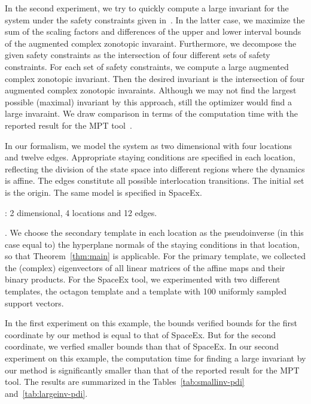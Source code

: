 In the second experiment, we try to quickly compute a large invariant
for the system under the safety constraints given
in~\cite{rakovic2004computation}.  %
In the latter case, we maximize the sum of the scaling factors and
differences of the upper and lower interval bounds of the augmented
complex zonotopic invaraint.  Furthermore, we decompose the given
safety constraints as the intersection of four different sets of
safety constraints.  For each set of safety constraints, we compute a
large augmented complex zonotopic invariant.  Then the desired
invariant is the intersection of four augmented complex zonotopic
invaraints.  Although we may not find the largest possible (maximal)
invariant by this approach, still the optimizer would find a large
invaraint.  We draw comparison in terms of the computation time with
the reported result for the MPT tool~\cite{rakovic2004computation}.

  In our formalism, we model the system as two
dimensional with four locations and twelve edges.  Appropriate staying
conditions are specified in each location, reflecting the division of
the state space into different regions where the dynamics is affine.
The edges constitute all possible interlocation transitions.  The
initial set is the origin.  The same model is specified in SpaceEx.

: 2 dimensional, 4 locations and 12 edges.

.  We choose the secondary template in each
location as the pseudoinverse (in this case equal to) the hyperplane
normals of the staying conditions in that location, so that
Theorem~\ref{thm:main} is applicable.  For the primary template, we
collected the (complex) eigenvectors of all linear matrices of the
affine maps and their binary products. For the SpaceEx tool, we
experimented with two different templates, the octagon template and a
template with 100 uniformly sampled support vectors.

  In the first experiment on this example, the bounds
verified bounds for the first coordinate by our method is equal to
that of SpaceEx. But for the second coordinate, we verfied smaller
bounds than that of SpaceEx.  In our second experiment on this
example, the computation time for finding a large invariant by our
method is significantly smaller than that of the reported result for
the MPT tool.  The results are summarized in the Tables~\ref{tab:smallinv-pdi}
and~\ref{tab:largeinv-pdi}.



